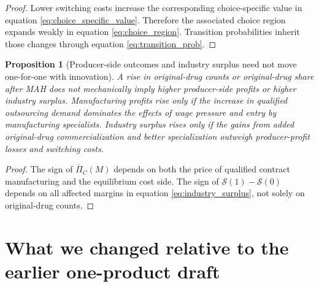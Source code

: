 \documentclass[12pt]{article}
\newtheorem{proposition}{Proposition}
\newcommand{\1}{\mathbf{1}}
\newcommand{\Surp}{\mathcal{S}}
\begin{document}
\begin{proof}
Lower switching costs increase the corresponding choice-specific value in equation \eqref{eq:choice_specific_value}. Therefore the associated choice region expands weakly in equation \eqref{eq:choice_region}. Transition probabilities inherit those changes through equation \eqref{eq:transition_prob}.
\end{proof}

\begin{proposition}[Producer-side outcomes and industry surplus need not move one-for-one with innovation]
A rise in original-drug counts or original-drug share after MAH does not mechanically imply higher producer-side profits or higher industry surplus. Manufacturing profits rise only if the increase in qualified outsourcing demand dominates the effects of wage pressure and entry by manufacturing specialists. Industry surplus rises only if the gains from added original-drug commercialization and better specialization outweigh producer-profit losses and switching costs.
\end{proposition}

\begin{proof}
The sign of $\bar\Pi_C(M)$ depends on both the price of qualified contract manufacturing and the equilibrium cost side. The sign of $\Surp(1)-\Surp(0)$ depends on all affected margins in equation \eqref{eq:industry_surplus}, not solely on original-drug counts.
\end{proof}

\section{What we changed relative to the earlier one-product draft}
\end{document}
